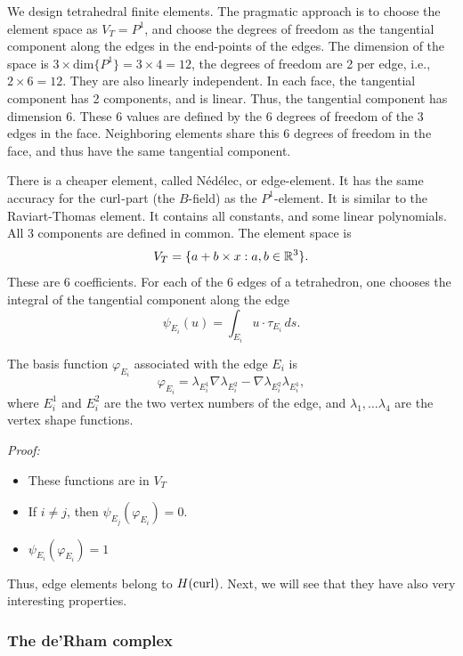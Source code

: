 \bigskip

We design tetrahedral finite elements.
The pragmatic approach is to choose the element space as $V_T = P^1$, and choose the 
degrees of freedom as the 
tangential component along the edges in the end-points of the edges. The dimension of
the space is $3 \times \mbox{dim} \{ P^1 \} = 3 \times 4 = 12$, the degrees of freedom
are 2 per edge, i.e., $2 \times 6 = 12$. They are also linearly independent. In each
face, the tangential component has 2 components, and is linear. Thus, the tangential
component has dimension 6. These 6 values are defined by the 6 degrees of freedom of the
3 edges in the face. Neighboring elements share this 6 degrees of freedom in the face,
and thus have the same tangential component.

\bigskip

There is a cheaper element, called N{\'e}d{\'e}lec, or edge-element. 
It has the same accuracy for the $\operatorname{curl}$-part (the $B$-field)  as the $P^1$-element. 
It is similar to the Raviart-Thomas element. It contains all constants, 
and some linear polynomials. All 3 components are defined in common. The element space is
$$
V_T = \{ a + b \times x : a, b \in {\mathbb R}^3 \}.
$$
These are 6 coefficients. For each of the 6 edges of a tetrahedron, one chooses the
integral of the tangential component along the edge
$$
\psi_{E_i}(u) = \int_{E_i} u \cdot \tau_{E_i} \, ds.
$$
\begin{lemma} The basis function $\varphi_{E_i}$ associated with the edge $E_i$ is
$$
\varphi_{E_i} = \lambda_{E_i^1} \nabla \lambda_{E_i^2} - \nabla \lambda_{E_i^2} \lambda_{E_i^1},
$$
where $E_i^1$ and $E_i^2$ are the two vertex numbers of the edge, and $\lambda_1, \ldots \lambda_4$
are the vertex shape functions.
\end{lemma}
{\em Proof: } \begin{itemize}
\item These functions are in $V_T$
\item If $i \neq j$, then $\psi_{E_j}(\varphi_{E_i}) = 0$.
\item $\psi_{E_i}(\varphi_{E_i}) = 1$
\end{itemize}

Thus, edge elements belong to $H(\operatorname{curl})$. Next, we will see that they have also very
interesting properties.

\subsubsection{The de'Rham complex}

